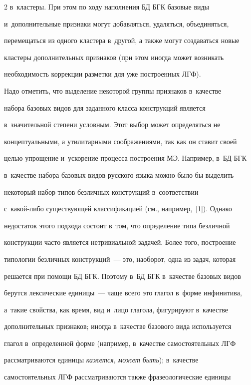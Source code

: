 \begin{multicols}{2}
в~клас\-те\-ры. При этом по ходу наполнения БД БГК базовые виды 

и~дополнительные признаки могут добавляться, удаляться, объединяться, 

перемещаться из одного кластера в~другой, а также могут создаваться новые 

кластеры дополнительных признаков (при этом иногда может возникать 

необходимость коррекции разметки для уже построенных ЛГФ).

  

  Надо отметить, что выделение некоторой группы признаков в~качестве 

набора базовых видов для заданного класса конструкций является 

в~значительной степени условным. Этот выбор может определяться не 

концептуальными, а утилитарными соображениями, так как он ставит своей 

целью упрощение и~ускорение процесса построения МЭ. Например, в~БД БГК 

в~качестве набора базовых видов русского языка можно было бы выделить 

некоторый набор типов безличных конструкций в~соответствии  

с~ка\-кой-ли\-бо существующей классификацией (см., например,~[1]). Однако 

недостаток этого подхода состоит в~том, что определение типа безличной 

конструкции часто является нетривиальной задачей. Более того, построение 

типологии безличных конструкций~--- это, наоборот, одна из задач, которая 

решается при помощи БД БГК. Поэтому в~БД БГК в~качестве базовых видов 

берутся лексические единицы~--- чаще всего это глагол в~форме инфинитива, 

а~такие свойства, как время, вид и~лицо глагола, фигурируют в~качестве 

дополнительных признаков; иногда в~качестве базового вида используется 

глагол в~определенной форме (например, в~качестве самостоятельных ЛГФ 

рассматриваются единицы \textit{кажется}, \textit{может быть}); в~качестве 

самостоятельных ЛГФ рассматриваются также фразеологические единицы 


\end{multicols}
